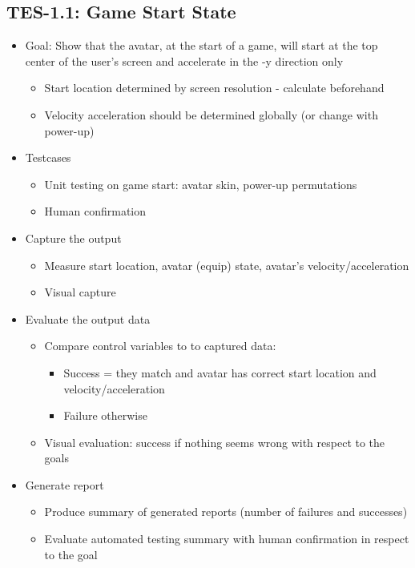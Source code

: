 \subsection{TES-1.1: Game Start State}
\label{subsec:gamestartstate}
\begin{itemize}
\item Goal: Show that the avatar, at the start of a game, will start at the top center of the user\textquoteright{}s screen and accelerate in the -y direction only
\begin{itemize}
\item Start location determined by screen resolution - calculate beforehand
\item Velocity acceleration should be determined globally (or change with power-up)
\end{itemize}

\item Testcases
\begin{itemize}
\item Unit testing on game start: avatar skin, power-up permutations
\item Human confirmation
\end{itemize}

\item Capture the output
\begin{itemize}
\item Measure start location, avatar (equip) state, avatar’s velocity/acceleration
\item Visual capture
\end{itemize}

\item Evaluate the output data
\begin{itemize}
\item Compare control variables to to captured data:
\begin{itemize}
\item Success = they match and avatar has correct start location and velocity/acceleration
\item Failure otherwise
\end{itemize}

\item Visual evaluation: success if nothing seems wrong with respect to the goals
\end{itemize}

\item Generate report
\begin{itemize}
\item Produce summary of generated reports (number of failures and successes)
\item Evaluate automated testing summary with human confirmation in respect to the goal
\end{itemize}
\end{itemize}

